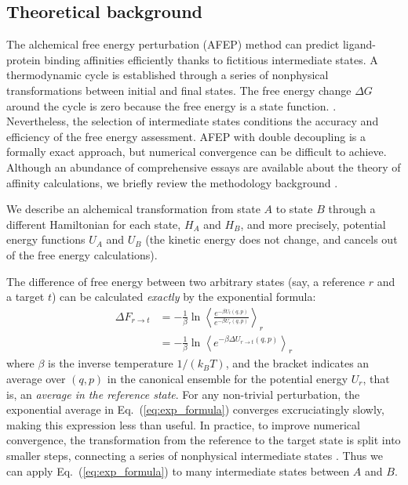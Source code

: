 \subsection{Theoretical background}
 The alchemical free energy perturbation (AFEP) method can predict ligand-protein binding affinities efficiently thanks to fictitious intermediate states. A thermodynamic cycle is established through a series of nonphysical transformations between initial and final states. The free energy change {$\Delta G$} around the cycle is zero because the free energy is a state function. \cite{Kollman1993, Chodera2011, Deng2018, Bhati2018, Kuhn2020}.
 Nevertheless, the selection of intermediate states conditions the accuracy and efficiency of the free energy assessment. AFEP with double decoupling is a formally exact approach, but numerical convergence can be difficult to achieve\cite{Pohorille2010}.
 Although an abundance of comprehensive essays are available about the theory of affinity calculations, we briefly review the methodology background \cite{Bhandarkar2009, VanGunsteren2002, Chipot2006}.

 We describe an alchemical transformation from state $A$ to state $B$ through a different Hamiltonian for each state, $H_A$ and $H_B$, and more precisely, potential energy functions $U_A$ and $U_B$ (the kinetic energy does not change, and cancels out of the free energy calculations).

 The difference of free energy between two arbitrary states (say, a reference $r$ and a target $t$) can be calculated \textit{exactly} by the exponential formula:\cite{Zwanzig1954}
 \begin{align}\label{eq:exp_formula}
 \Delta F_{r\rightarrow t} &= -\frac{1}{\beta}\ln{ \left\langle \frac{e^{-\beta U_t(q, p)}} {e^{-\beta U_r(q, p)}}
 \right\rangle}_r \\
 &= -\frac{1}{\beta}\ln{ \left\langle e^{-\beta\Delta U_{r\rightarrow t}(q, p)} \right\rangle}_r
 \end{align}
 where $\beta$ is the inverse temperature $1/(k_B T)$, and the bracket indicates an average over $(q, p)$ in the canonical ensemble for the potential energy $U_r$, that is, an \textit{average in the reference state}.
 For any non-trivial perturbation, the exponential average in Eq.~(\ref{eq:exp_formula}) converges excruciatingly slowly, making this expression less than useful.
 In practice, to improve numerical convergence, the transformation from the reference to the target state is split into smaller steps, connecting a series of nonphysical intermediate states \cite{Beveridge1989}.
 Thus we can apply Eq.~(\ref{eq:exp_formula}) to many intermediate states between $A$ and $B$.

